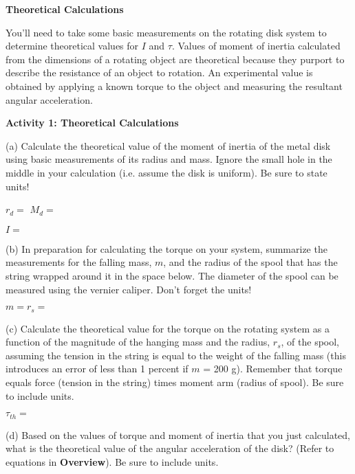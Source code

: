 \textbf{Theoretical Calculations} 

You'll need to take some basic measurements on the rotating disk system
to determine theoretical values for $I$ and \( \tau  \). Values of moment of
inertia calculated from the dimensions of a rotating object are theoretical
because they purport to describe the resistance of an object to rotation. An
experimental value is obtained by applying a known torque to the object and
measuring the resultant angular acceleration.

\newpage

\textbf{Activity 1: Theoretical Calculations }

(a) Calculate the theoretical value of the moment of inertia of the metal disk
using basic measurements of its radius and mass. Ignore the small hole in the
middle in your calculation (i.e. assume the disk is uniform). Be sure to state 
units!
\vspace{5mm}

\( r_{d} =\) \hfill{}\( M_{d}= \) \hfill{}
\vspace{5mm}

\( I = \) 
\answerspace{5mm}

(b) In preparation for calculating the torque on your system, summarize the
measurements for the falling mass, $m$, and the radius of the spool that has the string wrapped around it in the space below. The diameter of the spool can be measured using the vernier caliper. Don't forget the units!
\vspace{5mm}

$m = $\hfill{}\(r_{s}= \)\hfill{} 
\answerspace{5mm}

(c) Calculate the theoretical value for the torque on the rotating system as
a function of the magnitude of the hanging mass and the radius, \( r_{s} \),
of the spool, assuming the tension in the string is equal to the weight of the 
falling mass (this introduces an error of less than 1 percent if $m$ = 200 g). 
Remember that torque equals force (tension in the string) times 
moment arm (radius of spool). Be sure to include units.
\vspace{5mm}

\( \tau _{th}= \)
\answerspace{5mm}

(d) Based on the values of torque and moment of inertia that you just 
calculated, what is the theoretical value of the angular acceleration of the 
disk? (Refer to equations in \textbf{Overview}). Be sure to include units.
\vspace{5mm}

